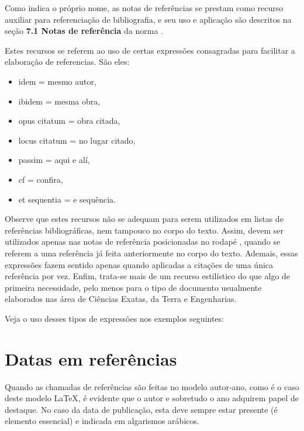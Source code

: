 \begin{apendicesenv}
Como indica o próprio nome, as notas de referências se prestam como recurso
auxiliar para referenciação de bibliografia, e seu uso e aplicação são descritos
na seção \textbf{7.1 Notas de referência} da norma .

Estes recursos se referem ao uso de certas expressões consagradas para facilitar
a elaboração de referencias. São eles:

\begin{itemize}
    \item idem = mesmo autor,
    \item ibidem = mesma obra,
    \item opus citatum = obra citada,
    \item locus citatum = no lugar citado,
    \item passim = aqui e alí,
    \item cf = confira,
    \item et sequentia = e sequência.
\end{itemize}

Observe que estes recursos não se adequam para serem utilizados em listas de
referências bibliográficas, nem tampouco no corpo do texto. Assim, devem ser
utilizados apenas nas notas de referência posicionadas no rodapé
\cite[p.~6]{abnTeX22014c}, quando se referem a uma referência já feita
anteriormente no corpo do texto. Ademais, essas expressões fazem sentido apenas
quando aplicadas a citações de uma única referência por vez. Enfim, trata-se
mais de um recurso estilístico do que algo de primeira necessidade, pelo menos
para o tipo de documento usualmente elaborados nas área de Ciências Exatas, da
Terra e Engenharias.

Veja o uso desses tipos de expressões nos exemplos seguintes:







\section{Datas em referências}
\label{sec:datasBib}

Quando as chamadas de referências são feitas no modelo autor-ano, como é o caso
deste modelo \LaTeX{}, é evidente que o autor e sobretudo o ano adquirem papel
de destaque. No caso da data de publicação, esta deve sempre estar presente
(é elemento essencial) e indicada em algarismos arábicos.


\end{apendicesenv}
